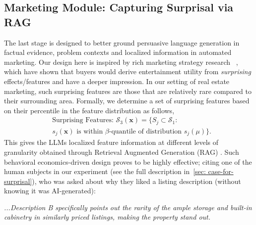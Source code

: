 \subsection{Marketing Module: Capturing Surprisal via RAG}
\label{sec: surprisal}
The last stage is designed to better ground persuasive language generation in factual evidence, problem contexts and localized information in automated marketing. Our design here is inspired by rich marketing strategy research ~\citep{lindgreen2005viral, ludden2008surprise, ely2015suspense}, which have shown that  buyers would derive entertainment utility from \emph{surprising} effects/features and have a deeper impression. 
In our setting of real estate marketing, such surprising features are   those that are relatively rare compared to their surrounding area.
Formally, we determine a set of surprising features based on their percentile in the feature distribution as follows,
 \begin{align*}
     &\text{Surprising Features: } \mathcal{S}_3(\mathbf{x})   =  \{ S_j \subset \mathcal{S}_1: \nonumber \\
     &s_j(\mathbf{x}) \text{ is within $\beta$-quantile  of   distribution } s_j(\mu) \}.
 \end{align*}
This gives the LLMs localized feature information at different levels of granularity obtained through Retrieval Augmented Generation (RAG) \citep{lewis2020retrieval}. Such behavioral economics-driven design proves to be highly effective; citing one of the human subjects in our experiment (see the full description in~\cref{sec: case-for-surprisal}), who was asked about why they liked a listing description (without knowing it was AI-generated): 
\vspace{-3mm}
\begin{myquote}{0.1in}
 \it
 ...Description B specifically points out the rarity of the ample storage and built-in cabinetry in similarly priced listings, making the property stand out.
\end{myquote}
